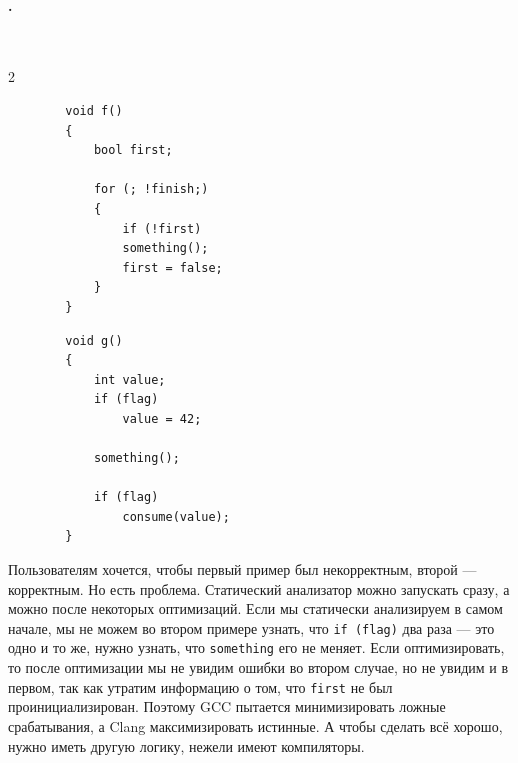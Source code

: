 \documentclass{article}
\begin{document}
    \paragraph{.}\mbox{}\\
    \begin{multicols}{2}
    \begin{verbatim}
        void f()
        {
            bool first;

            for (; !finish;)
            {
                if (!first)
                something();
                first = false;
            }
        }
    \end{verbatim}
    \columnbreak
    \begin{verbatim}
        void g()
        {
            int value;
            if (flag)
                value = 42;

            something();

            if (flag)
                consume(value);
        }
    \end{verbatim}
    \end{multicols}\noindent
    Пользователям хочется, чтобы первый пример был некорректным, второй --- корректным. Но есть проблема. Статический анализатор можно запускать сразу, а можно после некоторых оптимизаций. Если мы статически анализируем в самом начале, мы не можем во втором примере узнать, что \texttt{if (flag)} два раза --- это одно и то же, нужно узнать, что \texttt{something} его не меняет. Если оптимизировать, то после оптимизации мы не увидим ошибки во втором случае, но не увидим и в первом, так как утратим информацию о том, что \texttt{first} не был проинициализирован. Поэтому GCC пытается минимизировать ложные срабатывания, а Clang максимизировать истинные. А чтобы сделать всё хорошо, нужно иметь другую логику, нежели имеют компиляторы.
\end{document}
